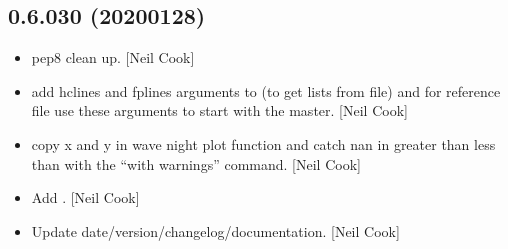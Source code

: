 \documentclass[a4paper,10pt,english]{report}
\begin{document}
\subsection{0.6.030 (2020\sphinxhyphen{}01\sphinxhyphen{}28)}
\label{\detokenize{misc/changelog:id8}}\begin{itemize}
\item {} 
 \sphinxhyphen{} pep8 clean up. {[}Neil Cook{]}

\item {} 
 \sphinxhyphen{} add hclines and fplines arguments to
 (to get lists from file) and for reference file use
these arguments to start with the master. {[}Neil Cook{]}

\item {} 
 \sphinxhyphen{} copy x and y in wave night plot function
and catch nan in greater than less than with the “with warnings”
command. {[}Neil Cook{]}

\item {} 
Add . {[}Neil Cook{]}

\item {} 
Update date/version/changelog/documentation. {[}Neil Cook{]}

\end{itemize}
\end{document}

